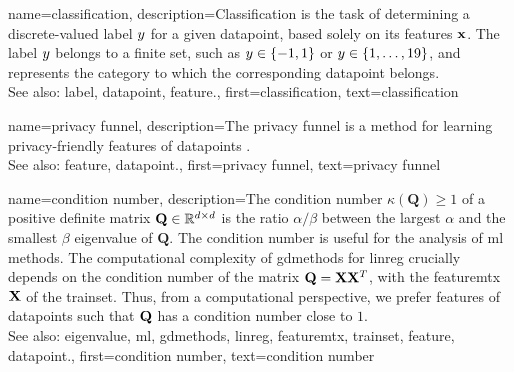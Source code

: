 {name={classification},
	description={Classification is the task of determining a 
 		discrete-valued \gls{label} $y$ for a given \gls{datapoint}, based solely on its 
 		\glspl{feature} ${\bf x}$. The \gls{label} $y$ belongs to a finite set, such as 
 		$y \in \{-1,1\}$ or $y \in \{1,\ldots,19\}$, and represents the 
 		category to which the corresponding \gls{datapoint} belongs.
				\\ 
		See also: \gls{label}, \gls{datapoint}, \gls{feature}.},
	first={classification},
	text={classification} 
}


{name={privacy funnel},
	description={The privacy funnel is a method for learning privacy-friendly \glspl{feature} 
		of \glspl{datapoint} \cite{PrivacyFunnel}.
				\\ 
		See also: \gls{feature}, \gls{datapoint}.},
 	first={privacy funnel},
	text={privacy funnel} 
}


{name={condition number},
	description={The condition number $\kappa(\mathbf{Q}) \geq 1$ of a 
		positive definite 
		matrix $\mathbf{Q} \in \mathbb{R}^{d \times d}$ is the ratio 
		$\alpha /\beta  $ between the 
		largest $\alpha$ and the smallest $\beta$ \gls{eigenvalue} of 
		$\mathbf{Q}$. The condition number is useful for the analysis of \gls{ml} methods. 
		The computational complexity of \gls{gdmethods} for \gls{linreg} crucially depends on the 
		condition number of the matrix $\mathbf{Q} = {\bf X} {\bf X}^{T}$, with the \gls{featuremtx} ${\bf X}$ 
		of the \gls{trainset}. Thus, from a computational perspective, we prefer \glspl{feature} of 
		\glspl{datapoint} such that $\mathbf{Q}$ has a condition number close to $1$.
					\\ 
		See also: \gls{eigenvalue}, \gls{ml}, \gls{gdmethods}, \gls{linreg}, \gls{featuremtx}, \gls{trainset}, \gls{feature}, \gls{datapoint}.},
	first={condition number},
	text={condition number} 
}

